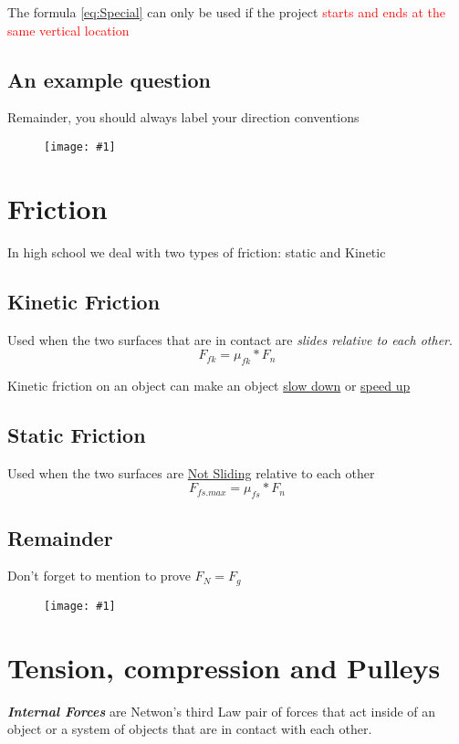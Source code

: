 \documentclass[11pt]{report}
\theoremstyle{remark}
\newcommand{\mypic}[3]{
    \begin{figure}[h!]
        \centering
        \texttt{[image: \#1]}
        \caption{#2}
    \end{figure}
}
\begin{document}
The formula \ref{eq:Special} can only be used if the project \textcolor{red}{starts and ends at the same vertical location}
\newpage
\subsection{An example question}
Remainder, you should always label your direction conventions

\mypic{graph/projectileReview.png}{}{0.8}

\section{Friction}
In high school we deal with two types of friction: static and Kinetic

\subsection{Kinetic Friction}
Used when the two surfaces that are in contact are \textit{slides relative to each other}.
\begin{equation}
    F_{fk} = \mu_{fk} * F_{n}
\end{equation}

Kinetic friction on an object can make an object \underline{slow down} or \underline{speed up}

\subsection{Static Friction}
Used when the two surfaces are \underline{Not Sliding} relative to each other
\begin{equation}
    F_{fs.max} = \mu_{fs} * F_{n}
\end{equation}

\subsection{Remainder}
Don't forget to mention to prove \underline{$F_{N} = F_{g}$}
\mypic{graph/example9.png}{}{0.7}

\section{Tension, compression and Pulleys}
\textbf{\textit{Internal Forces}} are Netwon's third Law pair of forces that act inside of an object or a system of objects
that are in contact with each other. \\
\end{document}
